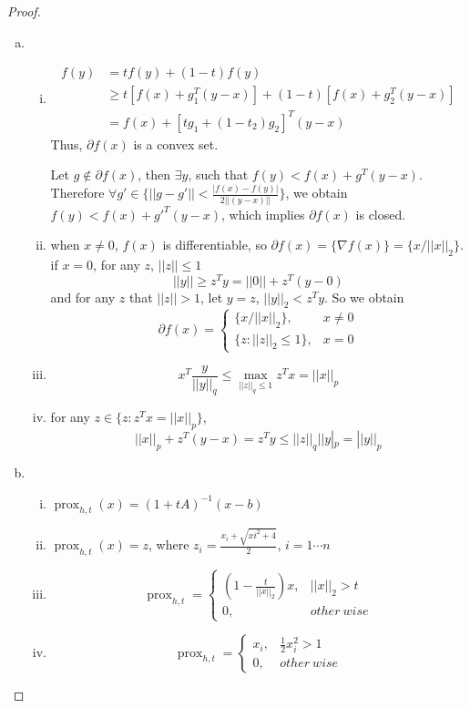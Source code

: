\documentclass{article}
\theoremstyle{remark}
\theoremstyle{definition}
\newcommand{\prox}{\operatorname{prox}}
\begin{document}
\begin{proof}
\begin{enumerate}[(a)]
    \item 
    \begin{enumerate}[(i)]
        \item   
        \begin{equation*}
        \begin{split}
        f(y)&=tf(y)+(1-t)f(y)\\
        &\geq t[f(x)+g_1^T(y-x)]+(1-t)[f(x)+g_2^T(y-x)]\\
        &=f(x)+[tg_1+(1-t_2)g_2]^T(y-x)
        \end{split}
        \end{equation*}
    Thus, $\partial f(x)$ is a convex set.
    
    Let $g \notin \partial f(x)$, then $\exists y$, such that $f(y)<f(x)+g^T(y-x)$. Therefore $\forall g'\in \{||g-g'||<\frac{|f(x)-f(y)|}{2||(y-x)||}\}$, we obtain $f(y)<f(x)+{g'}^T(y-x)$, which implies $\partial f(x)$ is closed.
    
    \item when $x\neq 0$, $f(x)$ is differentiable, so $\partial f(x)= \{\nabla f(x)\} = \{x/||x||_2\}$. if $x=0$, for any $z$, $||z||\leq 1$ \[||y||\geq z^Ty=||0||+z^T(y-0)\]
    and for any $z$ that $||z||>1$, let $y = z$, $||y||_2<z^Ty$. So we obtain
     $$
            \partial f(x) = \begin{cases}
            \{x / ||x||_2\}, & x\neq 0 \\
            \{z: ||z||_2\leq 1\}, & x = 0
            \end{cases}
            $$
 
    \item \[  x^T \frac{y}{||y||_q} \leq \max_{||z||_q \leq 1} z^Tx  = ||x||_p\]
    \item for any $z\in \{z:z^Tx=||x||_p\}$, 
    \[||x||_p+z^T(y-x) = z^Ty\leq ||z||_q||y|_p=||y||_p\]
                
 
    \end{enumerate} 
    \item 
  \begin{enumerate}[(i)]
    \item $\prox_{h,t}(x)=(1+tA)^{-1}(x-b)$
    \item $\prox_{h,t}(x)=z$, where $z_i=\frac{x_i+\sqrt{xi^2+4}}{2}$, $i=1\cdots n$
    \item $$\prox_{h,t}=\begin{cases}
    (1-\frac{t}{||x||_2})x, & ||x||_2>t\\
    0, & other~wise
    \end{cases}$$
    \item $$\prox_{h,t}=\begin{cases}
    x_i, & \frac{1}{2}x_i^2>1\\
    0, & other~wise
    \end{cases}$$
 \end{enumerate}   
 \end{enumerate}   
\end{proof}
\end{document}
